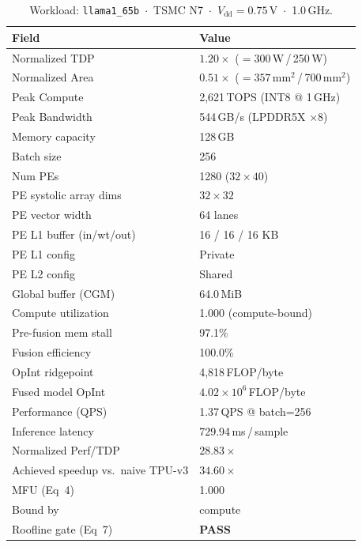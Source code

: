 \begin{table}[h]
\centering
\caption{Workload: \texttt{llama1\_65b}~$\cdot$~TSMC N7~$\cdot$~$V_\text{dd}=0.75$\,V~$\cdot$~1.0\,GHz.}
\label{tab:cheetah_v1_llama1_65b}
\small\setlength{\tabcolsep}{6pt}
\begin{tabular}{@{}ll@{}}
\toprule
\textbf{Field} & \textbf{Value} \\
\midrule
Normalized TDP          & $1.20\times$ ($= 300$\,W\,/\,250\,W) \\
Normalized Area         & $0.51\times$ ($= 357$\,mm$^2$\,/\,700\,mm$^2$) \\
Peak Compute            & 2{,}621\,TOPS (INT8 @ 1\,GHz) \\
Peak Bandwidth          & 544\,GB/s (LPDDR5X $\times$8) \\
Memory capacity         & 128\,GB \\
Batch size              & 256 \\
Num PEs                 & 1280 ($32 \times 40$) \\
PE systolic array dims  & $32 \times 32$ \\
PE vector width         & 64 lanes \\
PE L1 buffer (in/wt/out) & 16 / 16 / 16 KB \\
PE L1 config            & Private \\
PE L2 config            & Shared \\
Global buffer (CGM)     & 64.0\,MiB \\
\midrule
Compute utilization     & 1.000 (compute-bound) \\
Pre-fusion mem stall    & 97.1\% \\
Fusion efficiency       & 100.0\% \\
OpInt ridgepoint        & 4{,}818\,FLOP/byte \\
Fused model OpInt       & $4.02 \times 10^{6}$\,FLOP/byte \\
Performance (QPS)       & 1.37\,QPS @ batch=256 \\
Inference latency       & 729.94\,ms\,/\,sample \\
Normalized Perf/TDP     & $28.83\times$ \\
Achieved speedup vs.\ naive TPU-v3 & $34.60\times$ \\
MFU (Eq~4)              & 1.000 \\
Bound by                & compute \\
Roofline gate (Eq~7)    & \textcolor{green!60!black}{\textbf{PASS}} \\

\end{tabular}
\end{table}
